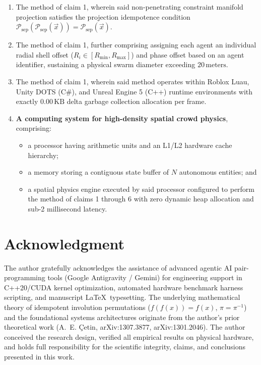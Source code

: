 \documentclass[11pt,a4paper]{article}
\begin{document}
\begin{enumerate}
    \item The method of claim 1, wherein said non-penetrating constraint manifold projection satisfies the projection idempotence condition $\mathcal{P}_{\text{sep}}(\mathcal{P}_{\text{sep}}(\vec{x})) = \mathcal{P}_{\text{sep}}(\vec{x})$.

    \item The method of claim 1, further comprising assigning each agent an individual radial shell offset ($R_i \in [R_{\min}, R_{\max}]$) and phase offset based on an agent identifier, sustaining a physical swarm diameter exceeding $20\,\text{meters}$.

    \item The method of claim 1, wherein said method operates within Roblox Luau, Unity DOTS (C\#), and Unreal Engine 5 (C++) runtime environments with exactly $0.00\,\text{KB}$ delta garbage collection allocation per frame.

    \item \textbf{A computing system for high-density spatial crowd physics}, comprising:
    \begin{itemize}
        \item a processor having arithmetic units and an L1/L2 hardware cache hierarchy;
        \item a memory storing a contiguous state buffer of $N$ autonomous entities; and
        \item a spatial physics engine executed by said processor configured to perform the method of claims 1 through 6 with zero dynamic heap allocation and sub-2 millisecond latency.
    \end{itemize}
\end{enumerate}

\section*{Acknowledgment}
The author gratefully acknowledges the assistance of advanced agentic AI pair-programming tools (Google Antigravity / Gemini) for engineering support in C++20/CUDA kernel optimization, automated hardware benchmark harness scripting, and manuscript \LaTeX\ typesetting. The underlying mathematical theory of idempotent involution permutations ($f(f(x))=f(x)$, $\pi = \pi^{-1}$) and the foundational systems architectures originate from the author's prior theoretical work (A.~E. {\c{C}}etin, arXiv:1307.3877, arXiv:1301.2046). The author conceived the research design, verified all empirical results on physical hardware, and holds full responsibility for the scientific integrity, claims, and conclusions presented in this work.
\end{document}
